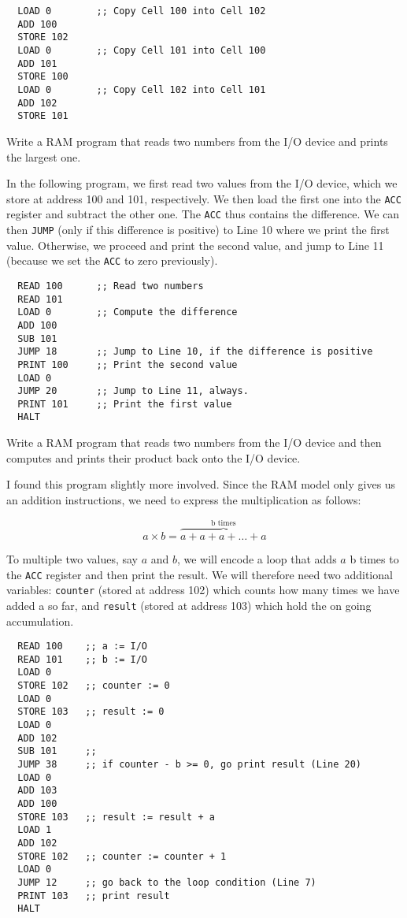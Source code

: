\documentclass{aldast}
\begin{document}
\begin{verbatim}
  LOAD 0        ;; Copy Cell 100 into Cell 102
  ADD 100
  STORE 102
  LOAD 0        ;; Copy Cell 101 into Cell 100
  ADD 101
  STORE 100
  LOAD 0        ;; Copy Cell 102 into Cell 101 
  ADD 102
  STORE 101
\end{verbatim}


\begin{exercise}
  Write a RAM program that reads two numbers from the I/O device and
  prints the largest one.
\end{exercise}

In the following program, we first read two values from the I/O
device, which we store at address 100 and 101, respectively. We then
load the first one into the \texttt{ACC} register and subtract the
other one. The \texttt{ACC} thus contains the difference. We can then
\texttt{JUMP} (only if this difference is positive) to Line 10 where
we print the first value. Otherwise, we proceed and print the second
value, and jump to Line 11 (because we set the \texttt{ACC} to zero
previously).

\begin{verbatim}
  READ 100      ;; Read two numbers 
  READ 101
  LOAD 0        ;; Compute the difference
  ADD 100
  SUB 101
  JUMP 18       ;; Jump to Line 10, if the difference is positive
  PRINT 100     ;; Print the second value
  LOAD 0
  JUMP 20       ;; Jump to Line 11, always.
  PRINT 101     ;; Print the first value
  HALT
\end{verbatim}

\begin{exercise}[{Multiplication}]
  Write a RAM program that reads two numbers from the I/O device and
  then computes and prints their product back onto the I/O device.
\end{exercise}

I found this program slightly more involved. Since the RAM model only
gives us an addition instructions, we need to express the
multiplication as follows:

\begin{equation}
  a \times b = \overbrace{a + a + a + \ldots + a}^{\textrm{b times}}
\end{equation}

To multiple two values, say $a$ and $b$, we will encode a loop that
adds $a$ b times to the \texttt{ACC} register and then print the
result. We will therefore need two additional variables:
\texttt{counter} (stored at address 102) which counts how many times
we have added a so far, and \texttt{result} (stored at address 103)
which hold the on going accumulation.

\begin{verbatim}
  READ 100    ;; a := I/O
  READ 101    ;; b := I/O
  LOAD 0
  STORE 102   ;; counter := 0
  LOAD 0
  STORE 103   ;; result := 0
  LOAD 0
  ADD 102
  SUB 101     ;; 
  JUMP 38     ;; if counter - b >= 0, go print result (Line 20)
  LOAD 0
  ADD 103       
  ADD 100
  STORE 103   ;; result := result + a
  LOAD 1
  ADD 102
  STORE 102   ;; counter := counter + 1
  LOAD 0
  JUMP 12     ;; go back to the loop condition (Line 7)
  PRINT 103   ;; print result
  HALT
\end{verbatim}
\end{document}
